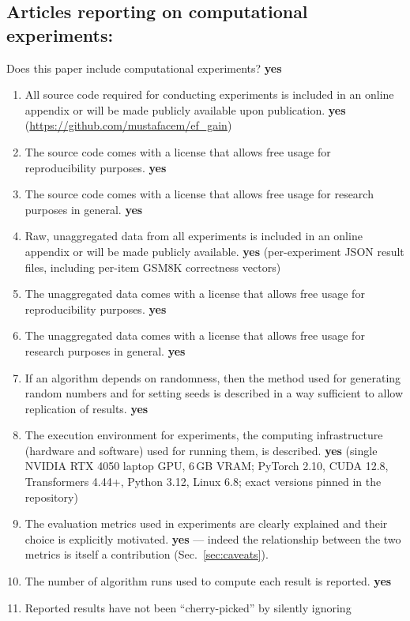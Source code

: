 \documentclass[manuscript, screen, review]{jair}
\begin{document}
\subsection*{Articles reporting on computational experiments:}
Does this paper include computational experiments? \textbf{yes}
\begin{enumerate}
    \item All source code required for conducting experiments is included in an
      online appendix or will be made publicly available upon publication.
      \textbf{yes} (\url{https://github.com/mustafacem/ef_gain})
    \item The source code comes with a license that allows free usage for
      reproducibility purposes. \textbf{yes}
    \item The source code comes with a license that allows free usage for
      research purposes in general. \textbf{yes}
    \item Raw, unaggregated data from all experiments is included in an online
      appendix or will be made publicly available. \textbf{yes} (per-experiment
      JSON result files, including per-item GSM8K correctness vectors)
    \item The unaggregated data comes with a license that allows free usage for
      reproducibility purposes. \textbf{yes}
    \item The unaggregated data comes with a license that allows free usage for
      research purposes in general. \textbf{yes}
    \item If an algorithm depends on randomness, then the method used for
      generating random numbers and for setting seeds is described in a way
      sufficient to allow replication of results. \textbf{yes}
    \item The execution environment for experiments, the computing
      infrastructure (hardware and software) used for running them, is
      described. \textbf{yes} (single NVIDIA RTX 4050 laptop GPU, 6\,GB VRAM;
      PyTorch 2.10, CUDA 12.8, Transformers 4.44+, Python 3.12, Linux 6.8;
      exact versions pinned in the repository)
    \item The evaluation metrics used in experiments are clearly explained and
      their choice is explicitly motivated. \textbf{yes} --- indeed the
      relationship between the two metrics is itself a contribution
      (Sec.~\ref{sec:caveats}).
    \item The number of algorithm runs used to compute each result is reported.
      \textbf{yes}
    \item Reported results have not been ``cherry-picked'' by silently ignoring

\end{enumerate}
\end{document}
